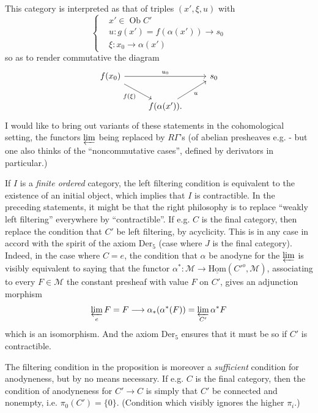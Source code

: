 \documentclass[11pt]{article}
\newcommand{\printedpage}[1]{\marginpar{\footnotesize p.~#1}}
\newcommand{\msp}[1]{\marginpar{\footnotesize [#1]}}
\begin{document}
\msp{page 3}

This category is interpreted as that of triples $(x', \xi, u)$ with
\[
\left\{
\begin{aligned}
& x' \in \operatorname{Ob} C' \\
& u : g(x') = f(\alpha(x')) \longrightarrow s_0 \\
& \xi : x_0 \longrightarrow \alpha(x')
\end{aligned}
\right.
\]
 so as to render commutative the diagram
\[
\begin{tikzcd}
f(x_0) \arrow[rr, "u_0"] \arrow[dr, "f(\xi)"'] & & s_0 \\
 & f(\alpha(x')). \arrow[ur, "u"'] &
\end{tikzcd}
\]
I would like to bring out variants of these statements in the cohomological setting, the functors $\varprojlim$ being replaced by $R\Gamma$'s (of abelian presheaves e.g. - but one also thinks of the ``noncommutative cases'', defined by derivators in particular.)

\clearpage

\printedpage{3}

If $I$ is a \textit{finite ordered} category, the left filtering condition is equivalent to the existence of an initial object, which implies that $I$ is contractible. In the preceding statements, it might be that the right philosophy is to replace ``weakly left filtering'' everywhere by ``contractible''. If e.g. $C$ is the final category, then replace the condition that $C'$ be left filtering, by acyclicity. This is in any case in accord with the spirit of the axiom $\mathrm{Der}_5$ (case where $J$ is the final category). Indeed, in the case where $C = e$, the condition that $\alpha$ be anodyne for the $\varprojlim$ is visibly equivalent to saying that the functor $\alpha^* : \mathcal{M} \longrightarrow \underline{\mathrm{Hom}}(C'^{o}, \mathcal{M})$, associating to every $F \in \mathcal{M}$ the constant presheaf with value $F$ %
\msp{page 4}
on $C'$, gives an adjunction morphism
\[ \varprojlim_{e} F = F \longrightarrow \alpha_*(\alpha^*(F)) = \varprojlim_{C'} \alpha^* F \]
which is an isomorphism. And the axiom $\mathrm{Der}_5$ ensures that it must be so if $C'$ is contractible.

The filtering condition in the proposition is moreover a \textit{sufficient} condition for anodyneness, but by no means necessary. If e.g. $C$ is the final category, then the condition of anodyneness for $C' \longrightarrow C$ is simply that $C'$ be connected and nonempty, i.e. $\pi_0(C') = \{0\}$. (Condition which visibly ignores the higher $\pi_i$.)
\end{document}
